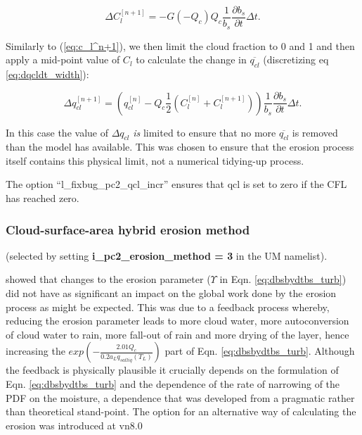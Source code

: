 \documentclass{UMDP_article}
\begin{document}
\begin{equation}
\Delta C_l^{[n+1]} = - G(-Q_c) Q_c \frac{1}{b_s}
\frac{\partial b_s}{\partial t} \Delta t.
\label{eq:dcl_turb_final}
\end{equation}

Similarly to (\ref{eq:c_l^n+1}), we then limit the cloud fraction to 0 and
1 and then apply a mid-point value of $C_l$ to calculate the change in
$\overline{q_{cl}}$ (discretizing eq \ref{eq:dqcldt_width}):

\begin{equation}
\Delta q_{cl}^{[n+1]} = (q_{cl}^{[n]} - Q_c \frac{1}{2}(C_l^{[n]}+C_l^{[n+1]}))
\frac{1}{b_s} \frac{\partial b_s}{\partial t} \Delta t.
\label{eq:dqcl_turb_final}
\end{equation}

In this case the value of $\Delta q_{cl}$ \textit{is} limited to ensure that
no more $\overline{q_{cl}}$ is removed than the model has available. This was
chosen to ensure that the erosion process itself contains this physical limit,
not a numerical tidying-up process.

The option ``l\_fixbug\_pc2\_qcl\_incr'' ensures that qcl is set to zero
if the CFL has reached zero.


\subsubsection{Cloud-surface-area hybrid erosion method}
(selected by setting {\bf i\_pc2\_erosion\_method = 3} in the UM namelist).

\cite{morcrette_petch} showed that changes to the erosion parameter ($\Upsilon$ in Eqn. \ref{eq:dbsbydtbs_turb}) did not have as significant an impact
on the global work done by the erosion process as might be expected. This was due to a feedback process
whereby, reducing the erosion parameter leads to more cloud water, more autoconversion of cloud water to rain, more
fall-out of rain and more drying of the layer, hence increasing the $exp ( - \frac{2.01 Q_c}{0.2 a_L q_{sat liq}(T_L)} )$ part of 
Eqn. \ref{eq:dbsbydtbs_turb}. Although the feedback is physically plausible it crucially depends on the formulation of
Eqn. \ref{eq:dbsbydtbs_turb} and the dependence of the rate of narrowing of the PDF on the moisture, a dependence that was developed
from a pragmatic rather than theoretical stand-point. 
The option for an alternative way of calculating the erosion was introduced at vn8.0
\end{document}
